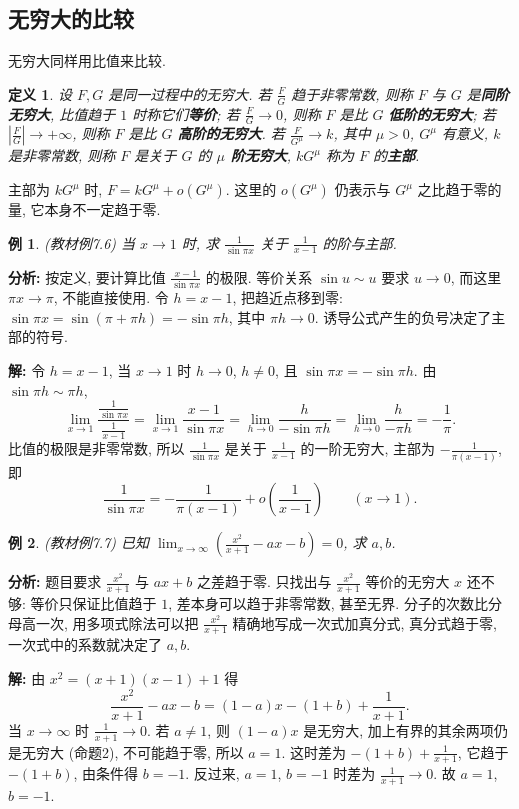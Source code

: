 \documentclass[UTF8,openany]{ctexbook}
\theoremstyle{chinesetextbook}
\newtheorem{definition}{定义}[section]
\newtheorem{example}{例}[section]
\newenvironment{cnsolution}{\par\indent\textbf{解:} \ignorespaces}{\par}
\begin{document}
\subsection{无穷大的比较}
无穷大同样用比值来比较.
\begin{definition}
设 $F,G$ 是同一过程中的无穷大. 若 $\displaystyle\frac FG$ 趋于非零常数, 则称 $F$ 与 $G$ 是\textbf{同阶无穷大}, 比值趋于 $1$ 时称它们\textbf{等价}; 若 $\displaystyle\frac FG\to0$, 则称 $F$ 是比 $G$ \textbf{低阶的无穷大}; 若 $\displaystyle\left|\frac FG\right|\to+\infty$, 则称 $F$ 是比 $G$ \textbf{高阶的无穷大}. 若 $\displaystyle\frac F{G^\mu}\to k$, 其中 $\mu>0$, $G^\mu$ 有意义, $k$ 是非零常数, 则称 $F$ 是关于 $G$ 的 \textbf{$\mu$ 阶无穷大}, $kG^\mu$ 称为 $F$ 的\textbf{主部}.
\end{definition}
主部为 $kG^\mu$ 时, $F=kG^\mu+o(G^\mu)$. 这里的 $o(G^\mu)$ 仍表示与 $G^\mu$ 之比趋于零的量, 它本身不一定趋于零.
\begin{example}\label{ex:7-6}
\textnormal{(教材例7.6)} 当 $x\to1$ 时, 求 $\displaystyle\frac1{\sin\pi x}$ 关于 $\displaystyle\frac1{x-1}$ 的阶与主部.
\end{example}
\par\indent\textbf{分析:} 按定义, 要计算比值 $\displaystyle\frac{x-1}{\sin\pi x}$ 的极限. 等价关系 $\sin u\sim u$ 要求 $u\to0$, 而这里 $\pi x\to\pi$, 不能直接使用. 令 $h=x-1$, 把趋近点移到零: $\sin\pi x=\sin(\pi+\pi h)=-\sin\pi h$, 其中 $\pi h\to0$. 诱导公式产生的负号决定了主部的符号.
\begin{cnsolution}
令 $h=x-1$, 当 $x\to1$ 时 $h\to0$, $h\ne0$, 且 $\sin\pi x=-\sin\pi h$. 由 $\sin\pi h\sim\pi h$,
\[
\lim_{x\to1}\frac{\frac1{\sin\pi x}}{\frac1{x-1}}=\lim_{x\to1}\frac{x-1}{\sin\pi x}=\lim_{h\to0}\frac h{-\sin\pi h}=\lim_{h\to0}\frac h{-\pi h}=-\frac1\pi.
\]
比值的极限是非零常数, 所以 $\displaystyle\frac1{\sin\pi x}$ 是关于 $\displaystyle\frac1{x-1}$ 的一阶无穷大, 主部为 $\displaystyle-\frac1{\pi(x-1)}$, 即
\[
\frac1{\sin\pi x}=-\frac1{\pi(x-1)}+o\!\left(\frac1{x-1}\right)\qquad(x\to1).
\]
\end{cnsolution}
\begin{example}
\textnormal{(教材例7.7)} 已知 $\displaystyle\lim_{x\to\infty}\left(\frac{x^2}{x+1}-ax-b\right)=0$, 求 $a,b$.
\end{example}
\par\indent\textbf{分析:} 题目要求 $\displaystyle\frac{x^2}{x+1}$ 与 $ax+b$ 之差趋于零. 只找出与 $\displaystyle\frac{x^2}{x+1}$ 等价的无穷大 $x$ 还不够: 等价只保证比值趋于 $1$, 差本身可以趋于非零常数, 甚至无界. 分子的次数比分母高一次, 用多项式除法可以把 $\displaystyle\frac{x^2}{x+1}$ 精确地写成一次式加真分式, 真分式趋于零, 一次式中的系数就决定了 $a,b$.
\begin{cnsolution}
由 $x^2=(x+1)(x-1)+1$ 得
\[
\frac{x^2}{x+1}-ax-b=(1-a)x-(1+b)+\frac1{x+1}.
\]
当 $x\to\infty$ 时 $\displaystyle\frac1{x+1}\to0$. 若 $a\ne1$, 则 $(1-a)x$ 是无穷大, 加上有界的其余两项仍是无穷大 (命题2), 不可能趋于零, 所以 $a=1$. 这时差为 $\displaystyle-(1+b)+\frac1{x+1}$, 它趋于 $-(1+b)$, 由条件得 $b=-1$. 反过来, $a=1$, $b=-1$ 时差为 $\displaystyle\frac1{x+1}\to0$. 故 $a=1$, $b=-1$.
\end{cnsolution}
\end{document}

